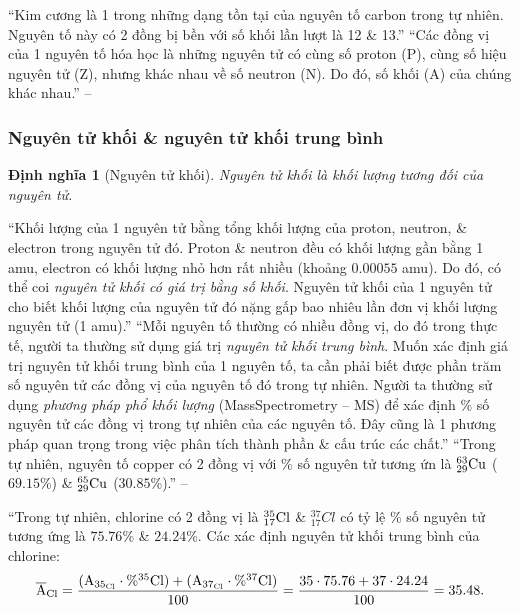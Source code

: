 \documentclass{article}
\numberwithin{equation}{section}
\newtheorem{dinhnghia}{Định nghĩa}[section]
\begin{document}
``Kim cương là 1 trong những dạng tồn tại của nguyên tố carbon trong tự nhiên. Nguyên tố này có 2 đồng bị bền với số khối lần lượt là 12 \& 13.'' ``Các đồng vị của 1 nguyên tố hóa học là những nguyên tử có cùng số proton (P), cùng số hiệu nguyên tử (Z), nhưng khác nhau về số neutron (N). Do đó, số khối (A) của chúng khác nhau.'' -- \cite[p. 23]{SGK_Hoa_Hoc_10_Chan_Troi_Sang_Tao}

\subsubsection{Nguyên tử khối \& nguyên tử khối trung bình}

\begin{dinhnghia}[Nguyên tử khối]
	\emph{Nguyên tử khối} là khối lượng tương đối của nguyên tử.
\end{dinhnghia}
``Khối lượng của 1 nguyên tử bằng tổng khối lượng của proton, neutron, \& electron trong nguyên tử đó. Proton \& neutron đều có khối lượng gần bằng 1 amu, electron có khối lượng nhỏ hơn rất nhiều (khoảng $0.00055$ amu). Do đó, có thể coi \textit{nguyên tử khối có giá trị bằng số khối}. Nguyên tử khối của 1 nguyên tử cho biết khối lượng của nguyên tử đó nặng gấp bao nhiêu lần đơn vị khối lượng nguyên tử (1 amu).'' ``Mỗi nguyên tố thường có nhiều đồng vị, do đó trong thực tế, người ta thường sử dụng giá trị \textit{nguyên tử khối trung bình}. Muốn xác định giá trị nguyên tử khối trung bình của 1 nguyên tố, ta cần phải biết được phần trăm số nguyên tử các đồng vị của nguyên tố đó trong tự nhiên. Người ta thường sử dụng \textit{phương pháp phổ khối lượng} (MassSpectrometry -- MS) để xác định \% số nguyên tử các đồng vị trong tự nhiên của các nguyên tố. Đây cũng là 1 phương pháp quan trọng trong việc phân tích thành phần \& cấu trúc các chất.'' ``Trong tự nhiên, nguyên tố copper có 2 đồng vị với \%  số nguyên tử tương ứn là $\rm{}_{29}^{63}Cu$ ($69.15$\%) \& $\rm{}_{29}^{65}Cu$ ($30.85$\%).'' -- \cite[p. 23]{SGK_Hoa_Hoc_10_Chan_Troi_Sang_Tao}

``Trong tự nhiên, chlorine có 2 đồng vị là $\rm{}_{17}^{35}Cl$ \& ${}_{17}^{37}Cl$ có tỷ lệ \% số nguyên tử tương ứng là $75.76\%$ \& $24.24$\%. Các xác định nguyên tử khối trung bình của chlorine:
\begin{align*}
	\rm\overline{A}_{Cl} = \frac{(A_{35_{Cl}}\cdot\%^{35}Cl) + (A_{37_{Cl}}\cdot\%^{37}Cl)}{100} = \frac{35\cdot 75.76 + 37\cdot 24.24}{100} = 35.48.
\end{align*}
\end{document}
